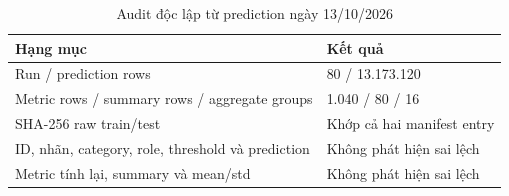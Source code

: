 \documentclass[12pt,a4paper,oneside]{report}
\begin{document}
\begin{table}[H]\centering\small
\caption{Audit độc lập từ prediction ngày 13/10/2026}
\begin{tabularx}{\textwidth}{L{8.5cm}Y}\toprule
Hạng mục & Kết quả\\\midrule
Run / prediction rows & 80 / 13.173.120\\
Metric rows / summary rows / aggregate groups & 1.040 / 80 / 16\\
SHA-256 raw train/test & Khớp cả hai manifest entry\\
ID, nhãn, category, role, threshold và prediction & Không phát hiện sai lệch\\
Metric tính lại, summary và mean/std & Không phát hiện sai lệch\\
\bottomrule\end{tabularx}\end{table}
\end{document}
